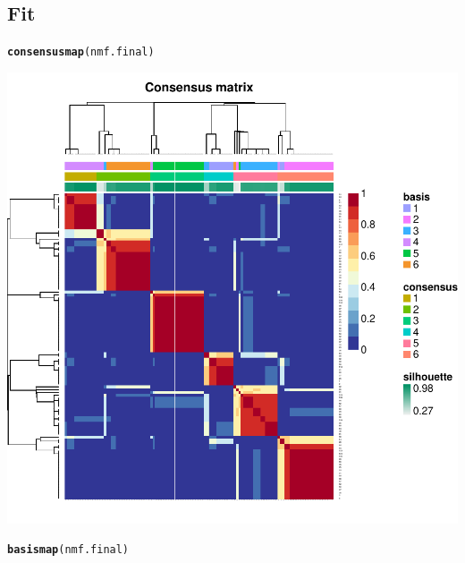 \documentclass{article}\usepackage[]{graphicx}\usepackage[]{color}
\makeatletter
\def\maxwidth{ %
  \ifdim\Gin@nat@width>\linewidth
    \linewidth
  \else
    \Gin@nat@width
  \fi
}
\newcommand{\hlstd}[1]{\textcolor[rgb]{0.345,0.345,0.345}{#1}}%
\newcommand{\hlkwd}[1]{\textcolor[rgb]{0.737,0.353,0.396}{\textbf{#1}}}%
\newenvironment{kframe}{%
 \def\at@end@of@kframe{}%
 \ifinner\ifhmode%
  \def\at@end@of@kframe{\end{minipage}}%
  \begin{minipage}{\columnwidth}%
 \fi\fi%
 \def\FrameCommand##1{\hskip\@totalleftmargin \hskip-\fboxsep
 \colorbox{shadecolor}{##1}\hskip-\fboxsep
     \hskip-\linewidth \hskip-\@totalleftmargin \hskip\columnwidth}%
 \MakeFramed {\advance\hsize-\width
   \@totalleftmargin\z@ \linewidth\hsize
   \@setminipage}}%
 {\par\unskip\endMakeFramed%
 \at@end@of@kframe}
\newenvironment{knitrout}{}{} %
\makeatother
\begin{document}
\subsection{Fit}
\begin{knitrout}
\color{fgcolor}\begin{kframe}
\begin{alltt}
\hlkwd{consensusmap}\hlstd{(nmf.final)}
\end{alltt}
\end{kframe}

{\centering \includegraphics[width=\maxwidth]{figure/nmf-plots-1} 

}


\begin{kframe}\begin{alltt}
\hlkwd{basismap}\hlstd{(nmf.final)}
\end{alltt}
\end{kframe}


\end{knitrout}
\end{document}
